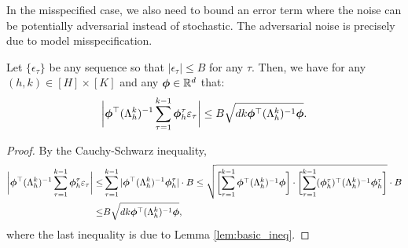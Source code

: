 

In the misspecified case, we also need to bound an error term where the noise can be potentially adversarial instead of stochastic. The adversarial noise is precisely due to model misspecification.
\begin{lemma}\label{lem:infinite_error}
Let $\{\epsilon_\tau\}$ be any sequence so that $|\epsilon_\tau| \le B$ for any $\tau$. Then, we have for any $(h, k) \in [H]\times[K]$ and any $\bm{\phi} \in \mathbb{R}^d$ that:
\begin{equation*}
\bigg |\bm{\phi}^{\top} (\Lambda^k_h)^{-1} \sum_{\tau = 1}^{k-1} \bm{\phi}^\tau_h \varepsilon_\tau \bigg|
\le B\sqrt{dk\bm{\phi}^{\top} (\Lambda^k_h)^{-1}  \bm{\phi}}. 
\end{equation*}
\end{lemma}

\begin{proof}
By the Cauchy-Schwarz inequality,
\begin{align*}
\bigg |\bm{\phi}^{\top} (\Lambda^k_h)^{-1} \sum_{\tau = 1}^{k-1} \bm{\phi}^\tau_h \varepsilon_\tau \bigg| \le& \sum_{\tau = 1}^{k-1}  |\bm{\phi}^{\top} (\Lambda^k_h)^{-1} \bm{\phi}^\tau_h| \cdot B
\le \sqrt{\biggl [ \sum_{\tau = 1}^{k-1}  \bm{\phi}^{\top} (\Lambda^k_h)^{-1}\bm{\phi}\biggr ]  \cdot \biggl [ \sum_{\tau = 1}^{k-1}  (\bm{\phi}^\tau_h)^{\top} (\Lambda^k_h)^{-1}\bm{\phi}^\tau_h\biggr ] } \cdot B\\
\le& B \sqrt{dk\bm{\phi}^{\top} (\Lambda^k_h)^{-1}  \bm{\phi}},
\end{align*}
where the last inequality is due to Lemma \ref{lem:basic_ineq}.
\end{proof}

